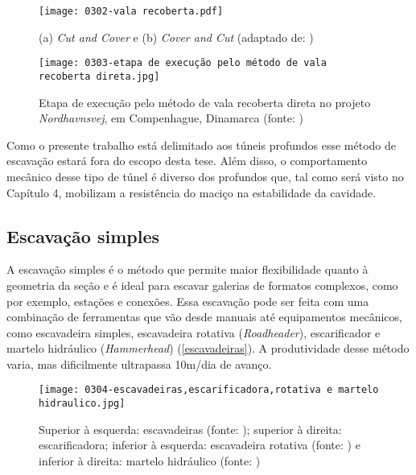 \begin{figure}[H]
	\begin{center}
		\texttt{[image: 0302-vala recoberta.pdf]}
	\end{center}
	\caption{\label{vala_recoberta}(a) \textit{Cut and Cover} e (b) \textit{Cover and Cut} (adaptado de: )}
\end{figure}

\begin{figure}[H]
	\begin{center}
		\texttt{[image: 0303-etapa de execução pelo método de vala recoberta direta.jpg]}
	\end{center}
	\caption{\label{etapa_execucao_vala_recoberta}Etapa de execução pelo método de vala recoberta direta no projeto \textit{Nordhavnsvej}, em Compenhague, Dinamarca (fonte: )}
\end{figure}

Como o presente trabalho está delimitado aos túneis profundos esse método de escavação estará fora do escopo desta tese. Além disso, o comportamento mecânico desse tipo de túnel é diverso dos profundos que, tal como será visto no Capítulo 4, mobilizam a resistência do maciço na estabilidade da cavidade.


\subsection{Escavação simples}

A escavação simples é o método que permite maior flexibilidade quanto à geometria da seção e é ideal para escavar galerias de formatos complexos, como por exemplo, estações e conexões. Essa escavação pode ser feita com uma combinação de ferramentas que vão desde manuais até equipamentos mecânicos, como escavadeira simples, escavadeira rotativa (\textit{Roadheader}), escarificador e martelo hidráulico (\textit{Hammerhead}) (\autoref{escavadeiras}). A produtividade desse método varia, mas dificilmente ultrapassa 10m/dia de avanço.

\begin{figure}[H]
	\begin{center}
		\texttt{[image: 0304-escavadeiras,escarificadora,rotativa e martelo hidraulico.jpg]}
	\end{center}
	\caption{\label{escavadeiras}Superior à esquerda: escavadeiras (fonte: ); superior à direita: escarificadora; inferior à esquerda: escavadeira rotativa (fonte: ) e inferior à direita: martelo hidráulico  (fonte: )}
\end{figure}


